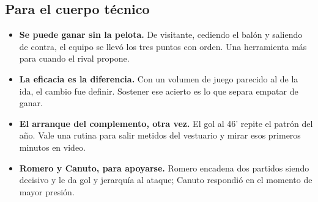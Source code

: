 \documentclass[11pt, a4paper]{article}
\begin{document}
\subsection*{Para el cuerpo técnico}
\begin{itemize}
  \item \textbf{Se puede ganar sin la pelota.} De visitante, cediendo el balón y saliendo de contra, el equipo se llevó los tres puntos con orden. Una herramienta más para cuando el rival propone.
  \item \textbf{La eficacia es la diferencia.} Con un volumen de juego parecido al de la ida, el cambio fue definir. Sostener ese acierto es lo que separa empatar de ganar.
  \item \textbf{El arranque del complemento, otra vez.} El gol al 46' repite el patrón del año. Vale una rutina para salir metidos del vestuario y mirar esos primeros minutos en video.
  \item \textbf{Romero y Canuto, para apoyarse.} Romero encadena dos partidos siendo decisivo y le da gol y jerarquía al ataque; Canuto respondió en el momento de mayor presión.
\end{itemize}
\end{document}
